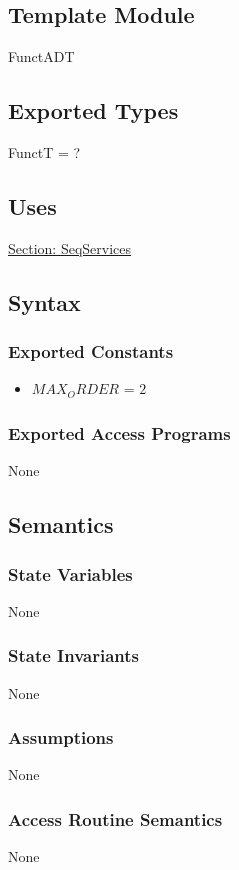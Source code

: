 \documentclass[12pt]{article}
\begin{document}
\subsection{Template Module}
\label{Sec:TemplateModule}
FunctADT
\subsection{Exported Types}
\label{Sec:ExpTypes}
FunctT = ?
\subsection{Uses}
\label{Sec:Uses}
\hyperref[Sec:SeqServicesADT]{Section: SeqServices}
\subsection{Syntax}
\label{Sec:Syntax}
\subsubsection{Exported Constants}
\label{Sec:ExpConstants}
\begin{itemize}
\item{$MAX_ORDER$ = $2$}
\end{itemize}
\subsubsection{Exported Access Programs}
\label{Sec:ExpAccPrograms}
None
\subsection{Semantics}
\label{Sec:Semantics}
\subsubsection{State Variables}
\label{Sec:StateVars}
None
\subsubsection{State Invariants}
\label{Sec:StateInvars}
None
\subsubsection{Assumptions}
\label{Sec:Assumps}
None
\subsubsection{Access Routine Semantics}
\label{Sec:AccRoutSemantics}
None
\end{document}
